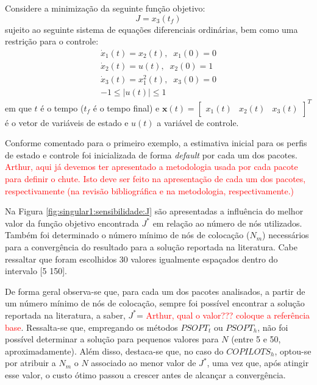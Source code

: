 \label{sec:singular1}

Considere a minimização da seguinte função objetivo:
%
\begin{equation}
	\label{eq:singular1:J}
	J = x_3(t_f)
\end{equation}
%
sujeito ao seguinte sistema de equações diferenciais ordinárias, bem como uma restrição para o controle:
%
\begin{equation}
	\label{eq:singular1:dinamica}
	\begin{gathered}
		\dot{x}_1(t) = x_2(t), \;\; x_1(0) = 0\\
		\dot{x}_2(t) = u(t), \;\; x_2(0) = 1 \\
		\dot{x}_3(t) = x_1^2(t), \;\; x_3(0) = 0\\
		-1 \leq |u(t)| \leq 1
	\end{gathered}
\end{equation}
%
em que $t$ é o tempo ($t_f$ é o tempo final) e $\mathbf{x}(t) = \begin{bmatrix} x_1(t) & x_2(t) & x_3(t) \end{bmatrix}^T $ é o vetor de variáveis de estado e $ u(t) $ a variável de controle. 

Conforme comentado para o primeiro exemplo, a estimativa inicial para os perfis de estado e controle foi inicializada de forma \textit{default} por cada um dos pacotes. \textcolor{red}{Arthur, aqui já devemos ter apresentado a metodologia usada por cada pacote para definir o chute. Isto deve ser feito na apresentação de cada um dos pacotes, respectivamente (na revisão bibliográfica e na metodologia, respectivamente.)}

Na Figura \ref{fig:singular1:sensibilidade:J} são apresentadas a influência do melhor valor da função objetivo encontrada $ J^* $ em relação ao número de nós utilizados. Também foi determinado o número mínimo de nós de colocação ($ N_m $) necessários para a convergência do resultado para a solução reportada na literatura. Cabe ressaltar que foram escolhidos 30 valores igualmente espaçados dentro do intervalo [5 150]. 

De forma geral observa-se que, para cada um dos pacotes analisados, a partir de um número mínimo de nós de colocação, sempre foi possível encontrar a solução reportada na literatura, a saber, $ J^* $= \textcolor{red}{Arthur, qual o valor??? coloque a referência base}. Ressalta-se que, empregando os métodos $ PSOPT_t $ ou $ PSOPT_h $, não foi possível determinar a solução para pequenos valores para $N$ (entre 5 e 50, aproximadamente). Além disso, destaca-se que, no caso do $ COPILOTS_h $, optou-se por atribuir a $ N_m $ o $ N $ associado ao menor valor de $ J^* $, uma vez que, após atingir esse valor, o custo ótimo passou a crescer antes de alcançar a convergência. 


